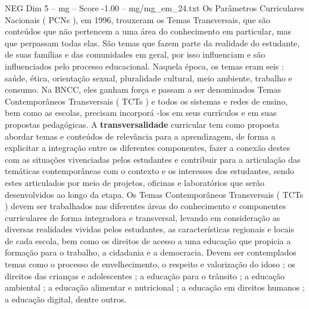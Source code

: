 \begin{textsample}{NEG Dim 5 – mg – Score -1.00 – mg/mg\_em\_24.txt}
Os Parâmetros Curriculares Nacionais ( PCNs ), em 1996, trouxeram os Temas Transversais, que são conteúdos que não pertencem a uma área do conhecimento em particular, mas que perpassam todas elas.
São temas que fazem parte da realidade do estudante, de suas famílias e das comunidades em geral, por isso influenciam e são influenciados pelo processo educacional.
Naquela época, os temas eram seis : saúde, ética, orientação sexual, pluralidade cultural, meio ambiente, trabalho e consumo.
Na BNCC, eles ganham força e passam a ser denominados Temas Contemporâneos Transversais ( TCTs ) e todos os sistemas e redes de ensino, bem como as escolas, precisam incorporá -los em seus currículos e em suas propostas pedagógicas.
A \textbf{transversalidade} curricular tem como proposta abordar temas e conteúdos de relevância para a aprendizagem, de forma a explicitar a integração entre os diferentes componentes, fazer a conexão destes com as situações vivenciadas pelos estudantes e contribuir para a articulação das temáticas contemporâneas com o contexto e os interesses dos estudantes, sendo estes articulados por meio de projetos, oficinas e laboratórios que serão desenvolvidos ao longo da etapa.
Os Temas Contemporâneos Transversais ( TCTs ) devem ser trabalhados nas diferentes áreas do conhecimento e componentes curriculares de forma integradora e transversal, levando em consideração as diversas realidades vividas pelos estudantes, as características regionais e locais de cada escola, bem como os direitos de acesso a uma educação que propicia a formação para o trabalho, a cidadania e a democracia.
Devem ser contemplados temas como o processo de envelhecimento, o respeito e valorização do idoso ; os direitos das crianças e adolescentes ; a educação para o trânsito ; a educação ambiental ; a educação alimentar e nutricional ; a educação em direitos humanos ; a educação digital, dentre outros.

\end{textsample}
